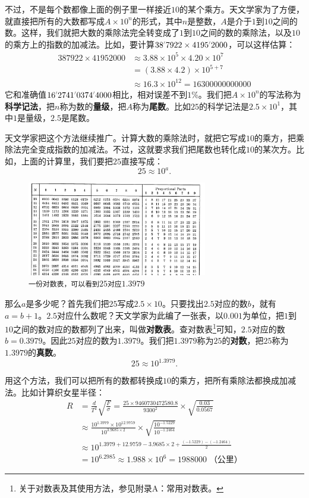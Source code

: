 \documentclass[12pt,UTF8]{ctexbook}
\begin{document}
不过，不是每个数都像上面的例子里一样接近$10$的某个乘方。天文学家为了方便，就直接把所有的大数都写成$A\times 10^{n}$的形式，其中$n$是整数，$A$是介于$1$到$10$之间的数。这样，我们就把大数的乘除法完全转变成了$1$到$10$之间的数的乘除法，以及$10$的乘方上的指数的加减法。比如，要计算$38\dlim{7922}\times 4195\dlim{2000}$，可以这样估算：
\begin{align*}
    387922 \times 41952000 &\approx 3.88 \times 10^5 \times 4.20 \times 10^7 \\
    &= (3.88 \times 4.2) \times 10^{5+7}\\
    &\approx 16.3 \times 10^{12} = 16300000000000
\end{align*}
它和准确值$16\dlim{2741}\dlim{0374}\dlim{4000}$相比，相对误差不到$1\%$。我们把$A\times 10^{n}$的写法称为\textbf{科学记法}，把$n$称为数的\textbf{量级}，把$A$称为\textbf{尾数}。比如$25$的科学记法是$2.5\times 10^1$，其中$1$是量级，$2.5$是尾数。

天文学家把这个方法继续推广。计算大数的乘除法时，就把它写成$10$的乘方，把乘除法完全变成指数的加减法。不过，这就要求我们把尾数也转化成$10$的某次方。比如，上面的计算里，我们要把$25$直接写成：
$$ 25 \approx 10^{a}.$$

\begin{figure}[h]
    \vspace{4pt}
    \centering
    \includegraphics[width=0.7\textwidth]{tu/logarithm_table2.png}
    \caption*{\texttt{一份对数表，可以看到$25$对应$1.3979$}}
\end{figure}

那么$a$是多少呢？首先我们把$25$写成$2.5\times 10$。只要找出$2.5$对应的数$b$，就有$a = b+1$。$2.5$对应什么数呢？天文学家为此编了一张表，以$0.001$为单位，把$1$到$10$之间的数对应的数都列了出来，叫做\textbf{对数表}。查对数表\footnote{关于对数表及其使用方法，参见附录A：常用对数表。}可知，$2.5$对应的数$b = 0.3979$。因此$25$对应的数为$1.3979$。我们把$1.3979$称为$25$的\textbf{对数}，把$25$称为$1.3979$的\textbf{真数}。
$$ 25 \approx 10^{1.3979}.$$

用这个方法，我们可以把所有的数都转换成$10$的乘方，把所有乘除法都换成加减法。比如计算织女星半径：
\begin{align*}
    R &= \frac{d}{T^2}\sqrt{\frac{F}{\sigma}} = \frac{25\times 9460730472580.8}{9300^2} \times \sqrt{\frac{0.03}{0.0567}} \\
    &\approx \frac{10^{1.3979}\times 10^{12.9759}}{10^{3.9685\times 2}} \times \sqrt{\frac{10^{-1.5229}}{10^{-1.2464}}} \\
    &\approx 10^{1.3979 + 12.9759 - 3.9685\times 2 + \frac{(-1.5229) - (-1.2464)}{2}}\\
    &= 10^{6.2985} \approx 1.988\times 10^6 = 1988000 \; \mbox{（公里）}
\end{align*}
\end{document}
